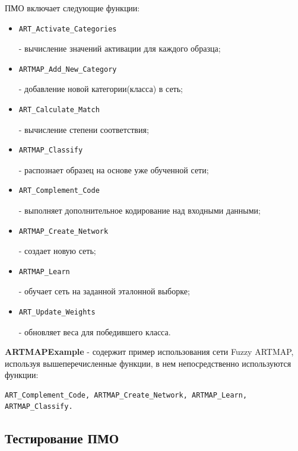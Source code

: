 ПМО включает следующие функции:
\begin{itemize}
	\item \begin{verbatim}ART_Activate_Categories\end{verbatim} - вычисление значений активации для каждого образца;
	\item \begin{verbatim}ARTMAP_Add_New_Category\end{verbatim} - добавление новой категории(класса) в сеть;
	\item \begin{verbatim}ART_Calculate_Match\end{verbatim} - вычисление степени соответствия;
	\item \begin{verbatim}ARTMAP_Classify\end{verbatim} - распознает образец на основе уже обученной сети;
	\item \begin{verbatim}ART_Complement_Code\end{verbatim} - выполняет дополнительное кодирование над входными данными;
	\item \begin{verbatim}ARTMAP_Create_Network\end{verbatim} - создает новую сеть;
	\item \begin{verbatim}ARTMAP_Learn\end{verbatim} - обучает сеть на заданной эталонной выборке;	
	\item \begin{verbatim}ART_Update_Weights\end{verbatim} - обновляет веса для победившего класса.
\end{itemize}

\textbf{ARTMAPExample} - содержит пример использования сети Fuzzy ARTMAP, используя вышеперечисленные функции, в нем непосредственно используются функции: \begin{verbatim}ART_Complement_Code, ARTMAP_Create_Network, ARTMAP_Learn,
ARTMAP_Classify.\end{verbatim}



\subsection{Тестирование ПМО}


